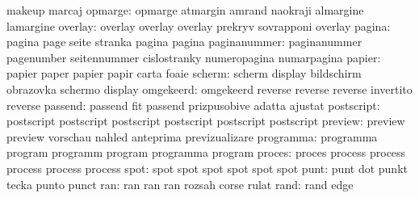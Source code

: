                            makeup                    marcaj
                  opmarge: opmarge                   atmargin
                           amrand                    naokraji
                           almargine                 lamargine
                  overlay: overlay                   overlay
                           overlay                   prekryv
                           sovrapponi                overlay
                   pagina: pagina                    page
                           seite                     stranka
                           pagina                    pagina
             paginanummer: paginanummer              pagenumber
                           seitennummer              cislostranky
                           numeropagina              numarpagina
                   papier: papier                    paper
                           papier                    papir
                           carta                     foaie
                   scherm: scherm                    display
                           bildschirm                obrazovka
                           schermo                   display %
                omgekeerd: omgekeerd                 reverse
                           reverse                   reverse
                           invertito                 reverse %
                  passend: passend                   fit
                           passend                   prizpusobive
                           adatta                    ajustat
               postscript: postscript                postscript
                           postscript                postscript
                           postscript                postscript
                  preview: preview                   preview
                           vorschau                  nahled
                           anteprima                 previzualizare
                programma: programma                 program
                           programm                  program
                           programma                 program
proces: proces   process 
        process  process 
        process  process 
  spot: spot spot 
        spot spot 
        spot spot 
                     punt: punt                      dot
                           punkt                     tecka
                           punto                     punct
                      ran: ran                       ran
                           ran                       rozsah
                           corse                     rulat
                     rand: rand                      edge
